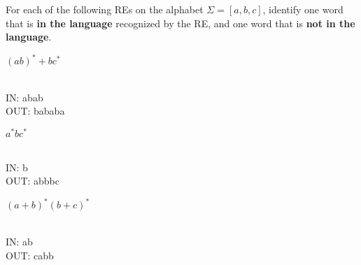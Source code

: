 \documentclass[12pt]{article}
\newenvironment{exercise}[2][Exercise]{\begin{trivlist}
\item[\hskip \labelsep {\bfseries #1}\hskip \labelsep {\bfseries #2.}]}{\end{trivlist}}
\newenvironment{solution}[1][{\color{red} Solution:}]{\begin{trivlist}
\item[\hskip \labelsep {\bfseries #1}\hskip \labelsep {\bfseries}]}{\end{trivlist}}
\begin{document}
 


\newcommand{\studentName}{Sabrina Hatch} %

\newcommand{\collaborators}{ 
	with \textit{Sabrina Hatch, Ramsha Rauf, Shalom Mhanda}
}

\begin{exercise}{1}
For each of the following REs on the alphabet $\Sigma = [a,b,c]$, identify one word that is \textbf{in the language} recognized by the RE, and one word that is \textbf{not in the language}.
\begin{enumerate}[(a)]
\item $(ab)^*+bc^*$
\begin{solution} 
\quad\\
IN: abab\\
OUT: bababa \\ 
\end{solution}

\item $a^*bc^*$
\begin{solution}
\quad\\
IN:  b \\
OUT:  abbbc
\end{solution}

\item $(a+b)^*(b+c)^*$
\begin{solution}
\quad\\
IN:  ab \\
OUT:  cabb
\end{solution}

\end{enumerate}
\end{exercise}

\clearpage
\end{document}
